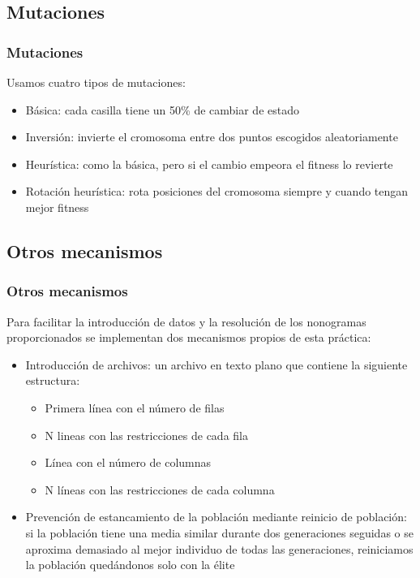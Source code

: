 \documentclass{beamer}
\begin{document}
\subsection{Mutaciones}
\begin{frame}
    \frametitle{Mutaciones}
    Usamos cuatro tipos de mutaciones:
    \begin{itemize}
        \item <1-> Básica: cada casilla tiene un 50\% de cambiar de estado
        \item <2-> Inversión: invierte el cromosoma entre dos puntos escogidos aleatoriamente
        \item <3-> Heurística: como la básica, pero si el cambio empeora el fitness lo revierte
        \item <4-> Rotación heurística: rota posiciones del cromosoma siempre y cuando tengan mejor fitness
    \end{itemize}
\end{frame}
\subsection{Otros mecanismos}
\begin{frame}
    \frametitle{Otros mecanismos}
    Para facilitar la introducción de datos y la resolución de los nonogramas proporcionados se implementan dos mecanismos propios de esta práctica:
    \begin{itemize}
        \item <1-> Introducción de archivos: un archivo en texto plano que contiene la siguiente estructura:
              \begin{itemize}
                  \item <1-> Primera línea con el número de filas
                  \item <1-> N lineas con las restricciones de cada fila
                  \item <1-> Línea con el número de columnas
                  \item <1-> N líneas con las restricciones de cada columna
              \end{itemize}
        \item <2-> Prevención de estancamiento de la población mediante reinicio de población: si la población tiene una media similar durante dos generaciones seguidas o se aproxima demasiado al mejor individuo de todas las generaciones, reiniciamos la población quedándonos solo con la élite
    \end{itemize}
\end{frame}
\end{document}
